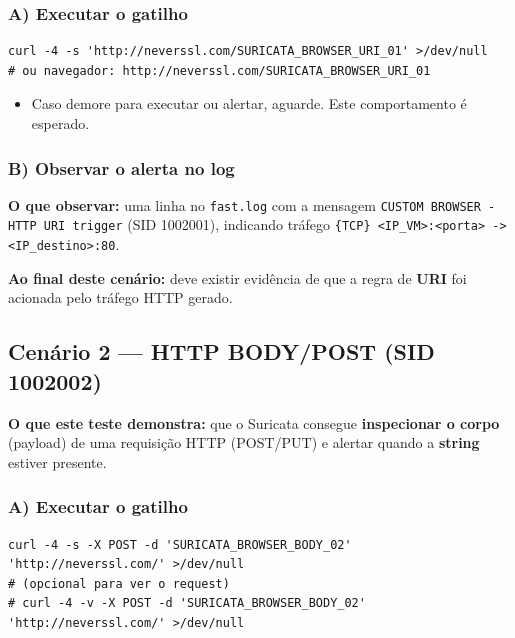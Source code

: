 \subsubsection*{A) Executar o gatilho}

\begin{lstlisting}
curl -4 -s 'http://neverssl.com/SURICATA_BROWSER_URI_01' >/dev/null
# ou navegador: http://neverssl.com/SURICATA_BROWSER_URI_01
\end{lstlisting}

\begin{itemize}
  \item Caso demore para executar ou alertar, aguarde. Este comportamento é esperado.
\end{itemize}


\subsubsection*{B) Observar o alerta no log}

\textbf{O que observar:} uma linha no \texttt{fast.log} com a mensagem \texttt{CUSTOM BROWSER - HTTP URI trigger} (SID 1002001), indicando tráfego \texttt{\{TCP\} <IP\_VM>:<porta> -> <IP\_destino>:80}.

\begin{notebox}
\textbf{Ao final deste cenário:} deve existir evidência de que a regra de \textbf{URI} foi acionada pelo tráfego HTTP gerado.
\end{notebox}

\subsection{Cenário 2 --- HTTP BODY/POST (SID 1002002)}

\textbf{O que este teste demonstra:} que o Suricata consegue \textbf{inspecionar o corpo} (payload) de uma requisição HTTP (POST/PUT) e alertar quando a \textbf{string} estiver presente.

\subsubsection*{A) Executar o gatilho}

\begin{lstlisting}
curl -4 -s -X POST -d 'SURICATA_BROWSER_BODY_02' 'http://neverssl.com/' >/dev/null
# (opcional para ver o request)
# curl -4 -v -X POST -d 'SURICATA_BROWSER_BODY_02' 'http://neverssl.com/' >/dev/null
\end{lstlisting}


